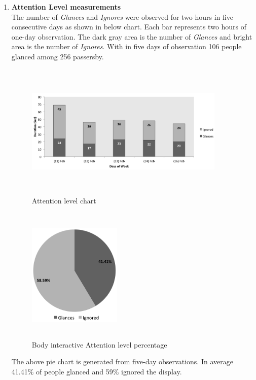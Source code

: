 \begin{enumerate}
\item \textbf{Attention Level measurements} \\
The number of \emph{Glances} and \emph{Ignores} were observed for two hours in five consecutive days as shown in below chart. Each bar represents two hours of one-day observation. The dark gray area is the number of \emph{Glances} and bright area is the number of \emph{Ignores}. With in five days of observation 106 people glanced among 256 passersby.
\begin{figure}[H]
    \centering
    \includegraphics[width=0.9\textwidth,height=6.5cm]{Figures/8/body_inter_findings/Body_Inter_chart}%
    \caption{Attention level chart}%
    \label{fig:bodyattentionlevelchart}%
\end{figure}


\begin{figure}[H]
    \centering
    \includegraphics[width=0.42\textwidth,height=6.5cm]{Figures/8/body_inter_findings/body_inter_percentage}
    \caption{Body interactive Attention level percentage}%
    \label{fig:bodyattentionlevelpercentage}%
\end{figure}

The above pie chart is generated from five-day observations. In average 41.41\% of people glanced and 59\% ignored the display. 


\end{enumerate}
